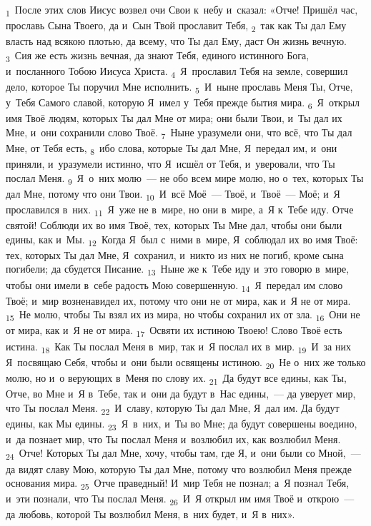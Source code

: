 \documentclass[a4paper,12pt]{article}
\begin{document}
\textsubscript{1}~После этих слов Иисус возвел очи Свои к~небу и~сказал: «Отче! Пришёл час, прославь Сына Твоего, да и~Сын Твой прославит Тебя, \textsubscript{2}~так как Ты дал Ему власть над всякою плотью, да всему, что Ты дал Ему, даст Он жизнь вечную. \textsubscript{3}~Сия же есть жизнь вечная, да знают Тебя, единого истинного Бога, и~посланного Тобою Иисуса Христа. \textsubscript{4}~Я~прославил Тебя на земле, совершил дело, которое Ты поручил Мне исполнить. \textsubscript{5}~И~ныне прославь Меня Ты, Отче, у~Тебя Самого славой, которую Я~имел у~Тебя прежде бытия мира. \textsubscript{6}~Я~открыл имя Твоё людям, которых Ты дал Мне от мира; они были Твои, и~Ты дал их Мне, и~они сохранили слово Твоё. \textsubscript{7}~Ныне уразумели они, что всё, что Ты дал Мне, от Тебя есть, \textsubscript{8}~ибо слова, которые Ты дал Мне, Я~передал им, и~они приняли, и~уразумели истинно, что Я~исшёл от Тебя, и~уверовали, что Ты послал Меня. \textsubscript{9}~Я~о~них молю~--- не обо всем мире молю, но о~тех, которых Ты дал Мне, потому что они Твои. \textsubscript{10}~И~всё Моё~--- Твоё, и~Твоё~--- Моё; и~Я прославился в~них. \textsubscript{11}~Я~уже не в~мире, но они в~мире, а~Я к~Тебе иду. Отче святой! Соблюди их во имя Твоё, тех, которых Ты Мне дал, чтобы они были едины, как и~Мы. \textsubscript{12}~Когда Я~был с~ними в~мире, Я~соблюдал их во имя Твоё: тех, которых Ты дал Мне, Я~сохранил, и~никто из них не погиб, кроме сына погибели; да сбудется Писание. \textsubscript{13}~Ныне же к~Тебе иду и~это говорю в~мире, чтобы они имели в~себе радость Мою совершенную. \textsubscript{14}~Я~передал им слово Твоё; и~мир возненавидел их, потому что они не от мира, как и~Я не от мира. \textsubscript{15}~Не молю, чтобы Ты взял их из мира, но чтобы сохранил их от зла. \textsubscript{16}~Они не от мира, как и~Я не от мира. \textsubscript{17}~Освяти их истиною Твоею! Слово Твоё есть истина. \textsubscript{18}~Как Ты послал Меня в~мир, так и~Я послал их в~мир. \textsubscript{19}~И~за них Я~посвящаю Себя, чтобы и~они были освящены истиною. \textsubscript{20}~Не о~них же только молю, но и~о верующих в~Меня по слову их. \textsubscript{21}~Да будут все едины, как Ты, Отче, во Мне и~Я в~Тебе, так и~они да будут в~Нас едины,~--- да уверует мир, что Ты послал Меня. \textsubscript{22}~И~славу, которую Ты дал Мне, Я~дал им. Да будут едины, как Мы едины. \textsubscript{23}~Я~в~них, и~Ты во Мне; да будут совершены воедино, и~да познает мир, что Ты послал Меня и~возлюбил их, как возлюбил Меня. \textsubscript{24}~Отче! Которых Ты дал Мне, хочу, чтобы там, где Я, и~они были со Мной,~--- да видят славу Мою, которую Ты дал Мне, потому что возлюбил Меня прежде основания мира. \textsubscript{25}~Отче праведный! И~мир Тебя не познал; а~Я познал Тебя, и~эти познали, что Ты послал Меня. \textsubscript{26}~И~Я открыл им имя Твоё и~открою~--- да любовь, которой Ты возлюбил Меня, в~них будет, и~Я в~них». 
\end{document}
